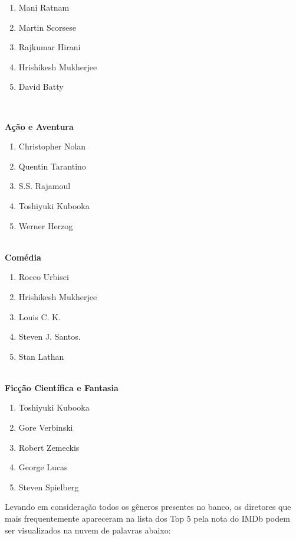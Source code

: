 \documentclass[a4paper, 12pt]{article} %
\begin{document}
\begin{enumerate}[topsep=0pt,partopsep=0pt]
    \item Mani Ratnam
    \item Martin Scorsese
    \item Rajkumar Hirani
    \item Hrishikesh Mukherjee
    \item David Batty
\end{enumerate}\\

\pagebreak

\textbf{Ação e Aventura}
\newline

\begin{enumerate}[topsep=0pt,partopsep=0pt]
    \item Christopher Nolan
    \item Quentin Tarantino
    \item S.S. Rajamoul
    \item Toshiyuki Kubooka
    \item Werner Herzog
\end{enumerate}\\

\textbf{Comédia}
\newline

\begin{enumerate}[topsep=0pt,partopsep=0pt]
    \item Rocco Urbisci
    \item Hrishikesh Mukherjee
    \item Louis C. K.
    \item Steven J. Santos.
    \item Stan Lathan
\end{enumerate}\\
\textbf{Ficção Científica e Fantasia}
\newline

\begin{enumerate}[topsep=0pt,partopsep=0pt]
    \item Toshiyuki Kubooka
    \item Gore Verbinski
    \item Robert Zemeckis
    \item George Lucas
    \item Steven Spielberg
\end{enumerate}

Levando em consideração todos os gêneros presentes no banco, os diretores que mais frequentemente apareceram na lista dos Top 5 pela nota do IMDb podem ser visualizados na nuvem de palavras abaixo:\\
\end{document}
